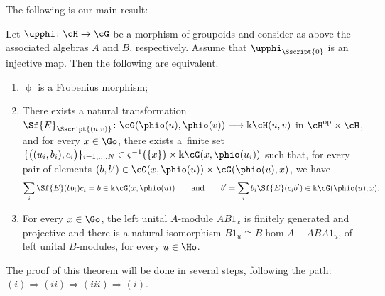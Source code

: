 The following is our main result:
\begin{Theorem}\label{thm:FM}Let $\upphi\colon \cH \to \cG$ be a morphism of groupoids and consider as above the associated algebras $A$ and $B$, respectively. Assume that $\upphi_{\Sscript{0}}$ is an injective map. Then the following are equivalent.
\begin{enumerate}[$(i)$]\itemsep=0pt
\item $\upphi$ is a Frobenius morphism;
\item There exists a natural transformation $\Sf{E}_{\Sscript{(u, v)}}\colon \cG(\phio(u),\phio(v)) \longrightarrow \Bbbk \cH(u,v)$ in $\cH^{\rm op} \times \cH$, and for every $x \in \Go$, there exists a~finite set
$\{\big((u_{i},b_{i}), c_{i}\big)\}_{i=1, \dots, N} \in \varsigma^{-1}\big( \{x\}\big)\times \Bbbk \cG(x, \phio(u_{i}))$ such that, for every pair of elements $ (b, b') \in \cG(x, \phio(u)) \times \cG(\phio(u), x)$, we have
\begin{gather*}
\sum_{i}\Sf{E}(bb_{i})c_{i} = b \in \Bbbk \cG(x, \phio(u)) \qquad \text{and} \qquad b' = \sum_{i}b_{i}\Sf{E}(c_{i}b') \in \Bbbk \cG(\phio(u), x).
\end{gather*}
\item For every $x\in \Go$, the left unital $A$-module $AB1_{x}$ is finitely generated and projective and there is a natural isomorphism $B1_{u} \cong B\hom{A-}{AB}{A1_{u}}$, of left unital $B$-modules, for every $u\in \Ho$.
\end{enumerate}
\end{Theorem}

The proof of this theorem will be done in several steps, following the path: $(i) \Rightarrow (ii) \Rightarrow (iii) \Rightarrow (i)$.

